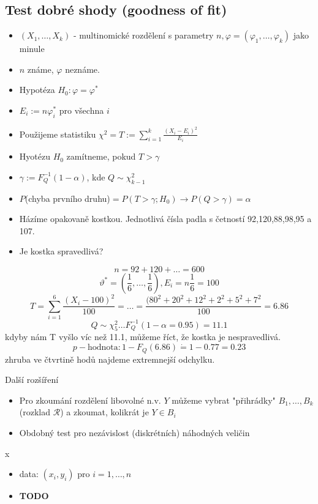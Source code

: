 \documentclass[../main.tex]{subfiles}
\begin{document}
\subsection{Test dobré shody (goodness of fit)}
\begin{itemize}
    \item $(X_1,\dots,X_k)$ - multinomické rozdělení s parametry $n,\varphi = (\varphi_1,\dots,\varphi_k)$ jako minule
    \item $n$ známe, $\varphi$ neznáme.
    \item Hypotéza $H_0: \varphi = \varphi^*$
    \item $E_i := n\varphi^*_i$ pro všechna $i$
    \item Použijeme statistiku $\chi^2 = T:= \sum^k_{i=1} \frac{(X_i-E_i)^2}{E_i}$
    \item Hyotézu $H_0$ zamítneme, pokud $T > \gamma$
    \item $\gamma := F^{-1}_Q (1-\alpha)$, kde $Q \sim \chi^2_{k-1}$
    \item $P$(chyba prvního druhu)$ = P(T > \gamma; H_0) \rightarrow P(Q>\gamma) = \alpha$
\end{itemize}
\begin{example}
    \begin{itemize}
        \item Házíme opakovaně kostkou. Jednotlivá čísla padla s četností 92,120,88,98,95 a 107.
        \item Je kostka spravedlivá?
    \end{itemize}
    \[ n = 92 + 120 +\dots = 600\]
    \[\vartheta^* = (\frac{1}{6}, \dots, \frac{1}{6}), E_i = n \frac{1}{6} = 100\]
    \[T = \sum^6_{i=1} \frac{(X_i - 100)^2}{100} = \dots = \frac{(80^2 + 20^2 + 12^2 + 2^2 + 5^2 + 7^2}{100} = 6.86\]
    \[Q \sim \chi^2_5 \dots F^{-1}_Q (1 - \alpha = 0.95) = 11.1\]
    kdyby nám T vyšlo víc než 11.1, můžeme říct, že kostka je nespravedlivá.
    \[p-\text{hodnota}: 1-F_Q(6.86) \dot{=} 1 - 0.77 = 0.23\]
    zhruba ve čtvrtině hodů najdeme extremnejší odchylku.
\end{example}

Další rozšíření
\begin{itemize}
    \item Pro zkoumání rozdělení libovolné n.v. $Y$ můžeme vybrat "přihrádky" $B_1,\dots,B_k$ (rozklad $\mathcal{R}$) a zkoumat, kolikrát je $Y \in B_i$
    \item Obdobný test pro nezávislost (diskrétních) náhodných veličin 
\end{itemize}

\begin{definition}
    {\color{white} x}
    \begin{itemize}
        \item data: $(x_i,y_i)$ pro $i=1,\dots,n$
        \item \textbf{TODO} 
    \end{itemize}
\end{definition}
\end{document}
